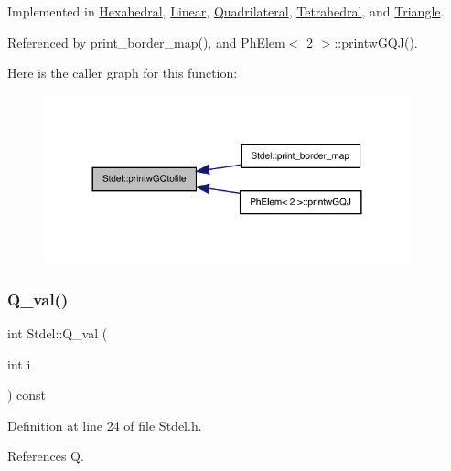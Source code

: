 Implemented in \hyperlink{classHexahedral_a49c5ff368a7d79790d94eef711cb8537}{Hexahedral}, \hyperlink{classLinear_a9afe2e4dfee0c0b43021f0086c3d9d1d}{Linear}, \hyperlink{classQuadrilateral_aceee4f58dc5e22dbe9e397d6a63a5248}{Quadrilateral}, \hyperlink{classTetrahedral_aaffdc06480015e7663d5c934a992b577}{Tetrahedral}, and \hyperlink{classTriangle_aaedabb652f02c2324f9503816b538d9a}{Triangle}.



Referenced by print\+\_\+border\+\_\+map(), and Ph\+Elem$<$ 2 $>$\+::printw\+G\+Q\+J().

Here is the caller graph for this function\+:
\nopagebreak
\begin{figure}[H]
\begin{center}
\leavevmode
\includegraphics[width=300pt]{classStdel_aec7751f7873772d930c91cf93ec6b07b_icgraph}
\end{center}
\end{figure}
\mbox{\label{classStdel_aeea4659f5bcabbf1acb374180c43a293}} 
\subsubsection{\texorpdfstring{Q\+\_\+val()}{Q\_val()}}
{\footnotesize\ttfamily int Stdel\+::\+Q\+\_\+val (\begin{DoxyParamCaption}\item[{int}]{i }\end{DoxyParamCaption}) const\hspace{0.3cm}{\ttfamily [inline]}}



Definition at line 24 of file Stdel.\+h.



References Q.

\mbox{\label{classStdel_a457d20e34fb7a32eb1e4aca6c19f53a2}} 
